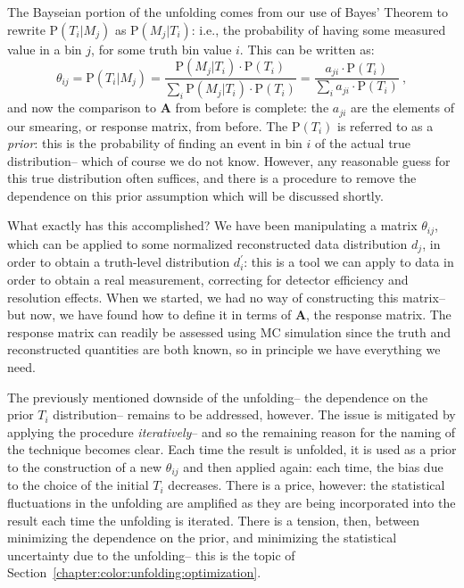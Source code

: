 	The Bayseian portion of the unfolding comes from our use of Bayes' Theorem to rewrite $\mathrm{P}(T_i|M_j)$ as $\mathrm{P}(M_j|T_i)$: i.e., the probability of having some measured value in a bin $j$, for some truth bin value $i$. This can be written as:
%
\begin{equation}
  \theta_{ij} = \mathrm{P}(T_i|M_j) = \frac{\mathrm{P}(M_j|T_i)\cdot \mathrm{P}(T_i)}{\sum_i \mathrm{P}(M_j|T_i)\cdot \mathrm{P}(T_i)} = \frac{a_{ji}\cdot \mathrm{P}(T_i)}{\sum_i a_{ji}\cdot \mathrm{P}(T_i)} \ ,
\end{equation}
%
	and now the comparison to $\mathbf{A}$ from before is complete: the $a_{ji}$ are the elements of our smearing, or response matrix, from before. The $\mathrm{P}(T_i)$ is referred to as a \textit{prior}: this is the probability of finding an event in bin $i$ of the actual true distribution-- which of course we do not know. However, any reasonable guess for this true distribution often suffices, and there is a procedure to remove the dependence on this prior assumption which will be discussed shortly.

	What exactly has this accomplished? We have been manipulating a matrix $\theta_{ij}$, which can be applied to some normalized reconstructed data distribution $d_j$, in order to obtain a truth-level distribution $d^\prime_i$: this is a tool we can apply to data in order to obtain a real measurement, correcting for detector efficiency and resolution effects. When we started, we had no way of constructing this matrix-- but now, we have found how to define it in terms of $\mathbf{A}$, the response matrix. The response matrix can readily be assessed using MC simulation since the truth and reconstructed quantities are both known, so in principle we have everything we need.

	The previously mentioned downside of the unfolding-- the dependence on the prior $T_i$ distribution-- remains to be addressed, however. The issue is mitigated by applying the procedure \textit{iteratively}-- and so the remaining reason for the naming of the technique becomes clear. Each time the result is unfolded, it is used as a prior to the construction of a new $\theta_{ij}$ and then applied again: each time, the bias due to the choice of the initial $T_i$ decreases. There is a price, however: the statistical fluctuations in the unfolding are amplified as they are being incorporated into the result each time the unfolding is iterated. There is a tension, then, between minimizing the dependence on the prior, and minimizing the statistical uncertainty due to the unfolding-- this is the topic of Section~\ref{chapter:color:unfolding:optimization}.

